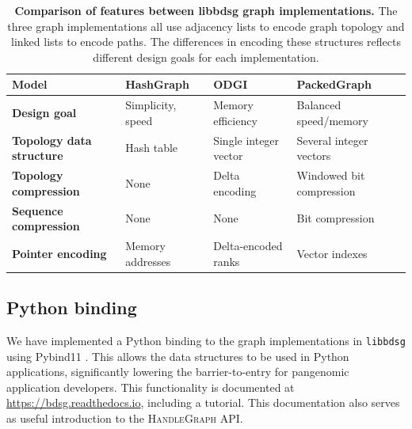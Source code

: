 \documentclass[11pt]{ucthesis}
\begin{document}

\begin{table}
\ssp
  \centering
\begin{tabular}{>{\raggedleft\arraybackslash}p{}|>{\raggedright\arraybackslash}p{}>{\raggedright\arraybackslash} p{}>{\raggedright\arraybackslash} p{}}
\textbf{Model} & HashGraph & ODGI & PackedGraph  \\
\hline
\textbf{Design goal} & Simplicity, speed & Memory efficiency & Balanced speed/memory \\
\Xhline{0.1\arrayrulewidth}
\textbf{Topology data structure} & Hash table & Single integer vector & Several integer vectors \\
\Xhline{0.1\arrayrulewidth}
\textbf{Topology compression} & None & Delta encoding & Windowed bit compression \\
\Xhline{0.1\arrayrulewidth}
\textbf{Sequence compression} & None & None & Bit compression \\
\Xhline{0.1\arrayrulewidth}
\textbf{Pointer encoding} & Memory addresses & Delta-encoded ranks & Vector indexes \\
\hline
\end{tabular}
\caption{
  \textbf{Comparison of features between libbdsg graph implementations.}
  The three graph implementations all use adjacency lists to encode graph topology and linked lists to encode paths. 
  The differences in encoding these structures reflects different design goals for each implementation.
}
\label{table:comparison}
\end{table}


\subsection{Python binding}

We have implemented a Python binding to the graph implementations in \texttt{libbdsg} using Pybind11 \cite{pybind11}.
This allows the data structures to be used in Python applications, significantly lowering the barrier-to-entry for pangenomic application developers.
This functionality is documented at \url{https://bdsg.readthedocs.io}, including a tutorial.
This documentation also serves as useful introduction to the \textsc{HandleGraph} API.
\end{document}
